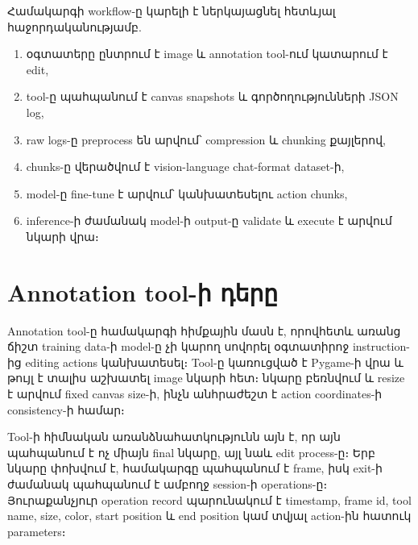 \documentclass[12pt,a4paper]{report}
\newcommand{\Eng}[1]{\textenglish{#1}}
\begin{document}
Համակարգի workflow-ը կարելի է ներկայացնել հետևյալ հաջորդականությամբ.
\begin{enumerate}
    \item օգտատերը ընտրում է image և annotation tool-ում կատարում է edit,
    \item tool-ը պահպանում է canvas snapshots և գործողությունների JSON log,
    \item raw logs-ը preprocess են արվում՝ compression և chunking քայլերով,
    \item chunks-ը վերածվում է vision-language chat-format dataset-ի,
    \item model-ը fine-tune է արվում՝ կանխատեսելու action chunks,
    \item inference-ի ժամանակ model-ի output-ը validate և execute է արվում նկարի վրա։
\end{enumerate}

\section{Annotation tool-ի դերը}

Annotation tool-ը համակարգի հիմքային մասն է, որովհետև առանց ճիշտ training data-ի model-ը չի կարող սովորել օգտատիրոջ instruction-ից editing actions կանխատեսել։ Tool-ը կառուցված է \Eng{Pygame}-ի վրա և թույլ է տալիս աշխատել image նկարի հետ։ նկարը բեռնվում և resize է արվում fixed canvas size-ի, ինչն անհրաժեշտ է action coordinates-ի consistency-ի համար։

Tool-ի հիմնական առանձնահատկությունն այն է, որ այն պահպանում է ոչ միայն final նկարը, այլ նաև edit process-ը։ Երբ նկարը փոխվում է, համակարգը պահպանում է frame, իսկ exit-ի ժամանակ պահպանում է ամբողջ session-ի operations-ը։ Յուրաքանչյուր operation record պարունակում է timestamp, frame id, tool name, size, color, start position և end position կամ տվյալ action-ին հատուկ parameters։
\end{document}

